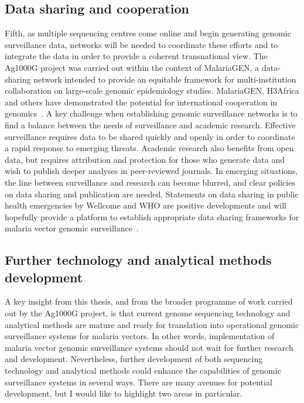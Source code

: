 \documentclass[a4paper,11pt,abstracton,hidelinks]{scrartcl}
\begin{document}
\subsection{Data sharing and cooperation}


Fifth, as multiple sequencing centres come online and begin generating genomic surveillance data, networks will be needed to coordinate these efforts and to integrate the data in order to provide a coherent transnational view.
%
The Ag1000G project was carried out within the context of MalariaGEN, a data-sharing network intended to provide an equitable framework for multi-institution collaboration on large-scale genomic epidemiology studies.
%
MalariaGEN, H3Africa and others have demonstrated the potential for international cooperation in genomics~\parencite{Mulder2018}.
%
A key challenge when establishing genomic surveillance networks is to find a balance between the needs of surveillance and academic research.
%
Effective surveillance requires data to be shared quickly and openly in order to coordinate a rapid response to emerging threats.
%
Academic research also benefits from open data, but requires attribution and protection for those who generate data and wish to publish deeper analyses in peer-reviewed journals.
%
In emerging situations, the line between surveillance and research can become blurred, and clear policies on data sharing and publication are needed.
%
Statements on data sharing in public health emergencies by Wellcome and WHO are positive developments and will hopefully provide a platform to establish appropriate data sharing frameworks for malaria vector genomic surveillance~\parencite{WHO2015SDPHE,Dye2016,Wellcome2016,Wellcome2020}.


\subsection{Further technology and analytical methods development}


A key insight from this thesis, and from the broader programme of work carried out by the Ag1000G project, is that current genome sequencing technology and analytical methods are mature and ready for translation into operational genomic surveillance systems for malaria vectors.
%
In other words, implementation of malaria vector genomic surveillance systems should not wait for further research and development.
%
Nevertheless, further development of both sequencing technology and analytical methods could enhance the capabilities of genomic surveillance systems in several ways.
%
There are many avenues for potential development, but I would like to highlight two areas in particular.
\end{document}
